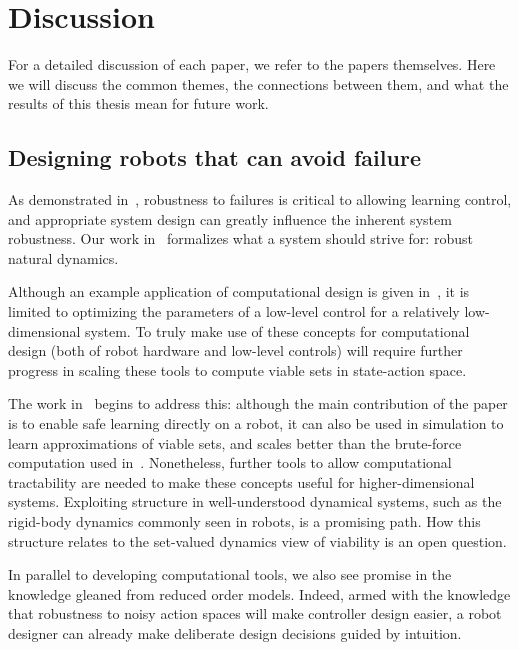 
\chapter{Discussion}

For a detailed discussion of each paper, we refer to the papers themselves. Here we will discuss the common themes, the connections between them, and what the results of this thesis mean for future work.

\section{Designing robots that can avoid failure}

As demonstrated in~\cite{heim2018shaping}, robustness to failures is critical to allowing learning control, and appropriate system design can greatly influence the inherent system robustness. Our work in~\cite{heim2019beyond} formalizes what a system should strive for: robust natural dynamics. \par
Although an example application of computational design is given in~\cite{heim2019beyond}, it is limited to optimizing the parameters of a low-level control for a relatively low-dimensional system. To truly make use of these concepts for computational design (both of robot hardware and low-level controls) will require further progress in scaling these tools to compute viable sets in state-action space. \par
The work in~\cite{heim2019learnable} begins to address this: although the main contribution of the paper is to enable safe learning directly on a robot, it can also be used in simulation to learn approximations of viable sets, and scales better than the brute-force computation used in~\cite{heim2019beyond}.
Nonetheless, further tools to allow computational tractability are needed to make these concepts useful for higher-dimensional systems. Exploiting structure in well-understood dynamical systems, such as the rigid-body dynamics commonly seen in robots, is a promising path. How this structure relates to the set-valued dynamics view of viability is an open question. \par
In parallel to developing computational tools, we also see promise in the knowledge gleaned from reduced order models. Indeed, armed with the knowledge that robustness to noisy action spaces will make controller design easier, a robot designer can already make deliberate design decisions guided by intuition.


